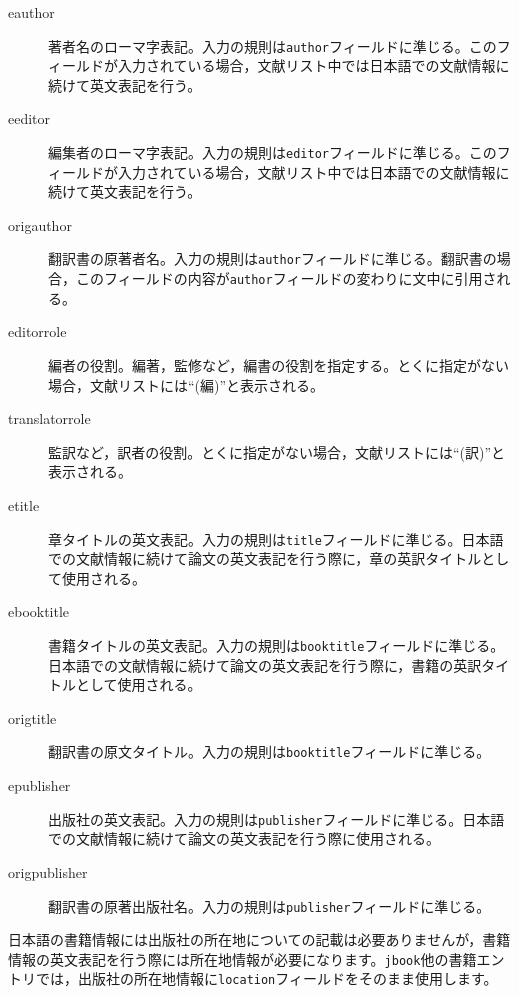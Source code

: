 \documentclass[12pt]{ltjsarticle}
\begin{document}
\begin{description}

\item[eauthor] 著者名のローマ字表記。入力の規則は\texttt{author}フィールドに準じる。このフィールドが入力されている場合，文献リスト中では日本語での文献情報に続けて英文表記を行う。

\item[eeditor] 編集者のローマ字表記。入力の規則は\texttt{editor}フィールドに準じる。このフィールドが入力されている場合，文献リスト中では日本語での文献情報に続けて英文表記を行う。

\item[origauthor] 翻訳書の原著者名。入力の規則は\texttt{author}フィールドに準じる。翻訳書の場合，このフィールドの内容が\texttt{author}フィールドの変わりに文中に引用される。

\item[editorrole] 編者の役割。編著，監修など，編書の役割を指定する。とくに指定がない場合，文献リストには``(編)''と表示される。

\item[translatorrole] 監訳など，訳者の役割。とくに指定がない場合，文献リストには``(訳)''と表示される。

\item[etitle] 章タイトルの英文表記。入力の規則は\texttt{title}フィールドに準じる。日本語での文献情報に続けて論文の英文表記を行う際に，章の英訳タイトルとして使用される。

\item[ebooktitle] 書籍タイトルの英文表記。入力の規則は\texttt{booktitle}フィールドに準じる。日本語での文献情報に続けて論文の英文表記を行う際に，書籍の英訳タイトルとして使用される。

\item[origtitle] 翻訳書の原文タイトル。入力の規則は\texttt{booktitle}フィールドに準じる。

\item[epublisher] 出版社の英文表記。入力の規則は\texttt{publisher}フィールドに準じる。日本語での文献情報に続けて論文の英文表記を行う際に使用される。

\item[origpublisher] 翻訳書の原著出版社名。入力の規則は\texttt{publisher}フィールドに準じる。

\end{description}

日本語の書籍情報には出版社の所在地についての記載は必要ありませんが，書籍情報の英文表記を行う際には所在地情報が必要になります。\texttt{jbook}他の書籍エントリでは，出版社の所在地情報に\texttt{location}フィールドをそのまま使用します。
\end{document}
